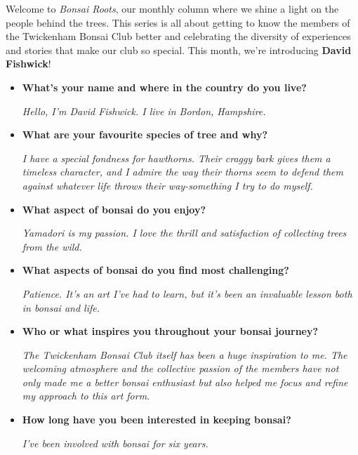 \label{2025-02-roots}
\noindent

Welcome to \emph{Bonsai Roots}, our monthly column where we shine a light on the people behind the trees.
This series is all about getting to know the members of the Twickenham Bonsai Club better and celebrating the diversity of experiences and stories that make our club so special.
This month, we're introducing \textbf{David Fishwick}!

\begin{itemize}
    \item \textbf{What's your name and where in the country do you live?}

    \emph{Hello, I'm David Fishwick. I live in Bordon, Hampshire.}

    \item \textbf{What are your favourite species of tree and why?}

    \emph{I have a special fondness for hawthorns. Their craggy bark gives them a timeless character, and I admire the way their thorns seem to defend them against whatever life throws their way-something I try to do myself.}

    \item \textbf{What aspect of bonsai do you enjoy?}

    \emph{Yamadori is my passion. I love the thrill and satisfaction of collecting trees from the wild.}

    \item \textbf{What aspects of bonsai do you find most challenging?}

    \emph{Patience. It's an art I've had to learn, but it's been an invaluable lesson both in bonsai and life.}

    \item \textbf{Who or what inspires you throughout your bonsai journey?}

    \emph{The Twickenham Bonsai Club itself has been a huge inspiration to me. The welcoming atmosphere and the collective passion of the members have not only made me a better bonsai enthusiast but also helped me focus and refine my approach to this art form.}

    \item \textbf{How long have you been interested in keeping bonsai?}

    \emph{I've been involved with bonsai for six years.}


\end{itemize}
